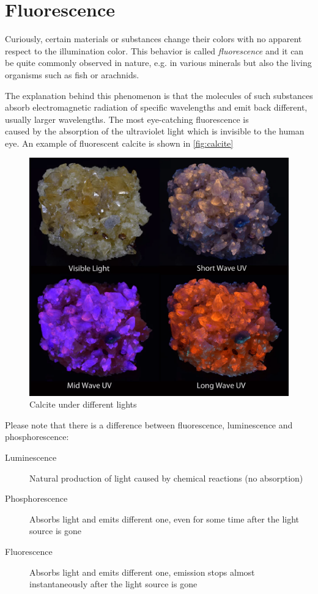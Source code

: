 \section{Fluorescence}

Curiously, certain materials or substances change their colors with no apparent respect to the illumination color. This behavior is called \emph{fluorescence} and it can be quite commonly observed in nature, e.g. in various minerals but also the living organisms such as fish or arachnids.

The explanation behind this phenomenon is that the molecules of such substances absorb electromagnetic radiation of specific wavelengths and emit back different, usually larger wavelengths. The most eye-catching fluorescence is \\ caused by the absorption of the ultraviolet light which is invisible to the human eye. An example of fluorescent calcite is shown in \autoref{fig:calcite}

\begin{figure}
	\centering
	\includegraphics[width=0.8\linewidth]{img/calcite.png}
	\caption[calcite]{Calcite under different lights\footnotemark}
	\label{fig:calcite}
\end{figure}

Please note that there is a difference between fluorescence, luminescence and phosphorescence:

\begin{description}
	\item[Luminescence] Natural production of light caused by chemical reactions (no absorption)
	\item[Phosphorescence] Absorbs light and emits different one, even for some time after the light source is gone
	\item[Fluorescence] Absorbs light and emits different one, emission stops almost instantaneously after the light source is gone
\end{description}

